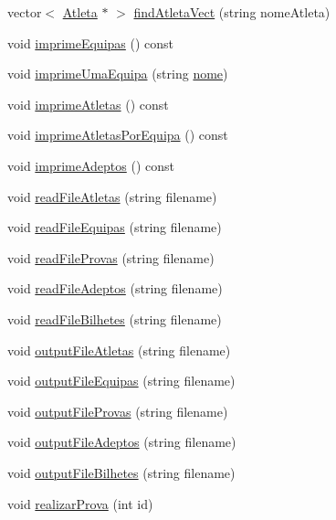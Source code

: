 \begin{DoxyCompactItemize}
vector$<$ \hyperlink{class_atleta}{Atleta} $\ast$ $>$ \hyperlink{class_campeonato_abe0557f6d0fe33787a6d44e85fd8bda3}{find\+Atleta\+Vect} (string nome\+Atleta)
\item 
void \hyperlink{class_campeonato_a9e43dc72a8bf29c332209a37a8bdb1d8}{imprime\+Equipas} () const 
\item 
void \hyperlink{class_campeonato_aad257942dd3f514d80fd8a9292dd03e2}{imprime\+Uma\+Equipa} (string \hyperlink{class_campeonato_a670b0857b7a8bc3c5dbf0f927ee192fe}{nome})
\item 
void \hyperlink{class_campeonato_a6a51ed1d4c6ca51bdc407144589d5894}{imprime\+Atletas} () const 
\item 
void \hyperlink{class_campeonato_a4bbcc137067e9f72c169e22ce1c28858}{imprime\+Atletas\+Por\+Equipa} () const 
\item 
void \hyperlink{class_campeonato_aae7fd3818bfccc73a9e91bb6eea79849}{imprime\+Adeptos} () const 
\item 
void \hyperlink{class_campeonato_a4f443b1fb65733062b40dd529d5ad63e}{read\+File\+Atletas} (string filename)
\item 
void \hyperlink{class_campeonato_a93f60ccc2608b0c99a978bc93fd881ac}{read\+File\+Equipas} (string filename)
\item 
void \hyperlink{class_campeonato_a4098bb3bde66ead9ecaa61e10aef2a5e}{read\+File\+Provas} (string filename)
\item 
void \hyperlink{class_campeonato_a24e83e8edd6fe99fbb834a15110ec6e8}{read\+File\+Adeptos} (string filename)
\item 
void \hyperlink{class_campeonato_a7cd0e87a1ca591e77af05efcf0614b1e}{read\+File\+Bilhetes} (string filename)
\item 
void \hyperlink{class_campeonato_acef3bbad2dd3afaf348a888fa2ee8b4c}{output\+File\+Atletas} (string filename)
\item 
void \hyperlink{class_campeonato_a6b641747f988d0498046d1e906595d13}{output\+File\+Equipas} (string filename)
\item 
void \hyperlink{class_campeonato_ac3e2f507c842cde6b2f0f248bb567084}{output\+File\+Provas} (string filename)
\item 
void \hyperlink{class_campeonato_abd4a9d696a620dedca6fe1bcf7e9b7a1}{output\+File\+Adeptos} (string filename)
\item 
void \hyperlink{class_campeonato_a45c704af5fba03ef472107810e51ddd0}{output\+File\+Bilhetes} (string filename)
\item 
void \hyperlink{class_campeonato_ac00744815952c31c3d5ba905dbc1494c}{realizar\+Prova} (int id)

\end{DoxyCompactItemize}
